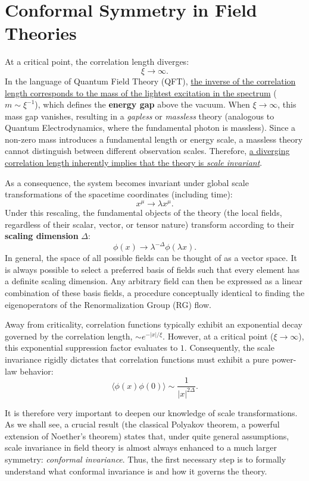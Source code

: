 \section{Conformal Symmetry in Field Theories}

At a critical point, the correlation length diverges:
\[
    \xi\rightarrow\infty.
\]
In the language of Quantum Field Theory (QFT), \uline{the inverse of the correlation length corresponds to the mass of the lightest excitation in the spectrum} (\(m \sim \xi^{-1}\)), which defines the \textbf{energy gap} above the vacuum. When \(\xi \rightarrow \infty\), this mass gap vanishes, resulting in a \textit{gapless} or \textit{massless} theory (analogous to Quantum Electrodynamics, where the fundamental photon is massless). Since a non-zero mass introduces a fundamental length or energy scale, a massless theory cannot distinguish between different observation scales. Therefore, \uline{a diverging correlation length inherently implies that the theory is \textit{scale invariant}}.

As a consequence, the system becomes invariant under global scale transformations of the spacetime coordinates (including time):
\[
    x^{\mu}\rightarrow\lambda x^{\mu}.
\]
Under this rescaling, the fundamental objects of the theory (the local fields, regardless of their scalar, vector, or tensor nature) transform according to their \textbf{scaling dimension} \(\Delta\):
\[
    \phi(x)\rightarrow\lambda^{-\Delta}\phi(\lambda x).
\]
In general, the space of all possible fields can be thought of as a vector space. It is always possible to select a preferred basis of fields such that every element has a definite scaling dimension. Any arbitrary field can then be expressed as a linear combination of these basis fields, a procedure conceptually identical to finding the eigenoperators of the Renormalization Group (RG) flow.

Away from criticality, correlation functions typically exhibit an exponential decay governed by the correlation length, \(\sim e^{-|x|/\xi}\). However, at a critical point (\(\xi \rightarrow \infty\)), this exponential suppression factor evaluates to \(1\). Consequently, the scale invariance rigidly dictates that correlation functions must exhibit a pure power-law behavior:
\[
    \langle\phi(x)\phi(0)\rangle\sim\frac{1}{|x|^{2\Delta}}.
\]

It is therefore very important to deepen our knowledge of scale transformations. As we shall see, a crucial result (the classical Polyakov theorem, a powerful extension of Noether's theorem) states that, under quite general assumptions, scale invariance in field theory is almost always enhanced to a much larger symmetry: \textit{conformal invariance}. Thus, the first necessary step is to formally understand what conformal invariance is and how it governs the theory.

